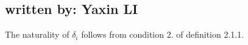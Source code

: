 \subsection{written by: Yaxin LI}
The naturality of $\delta_i$ follows from condition 2. of definition 2.1.1.